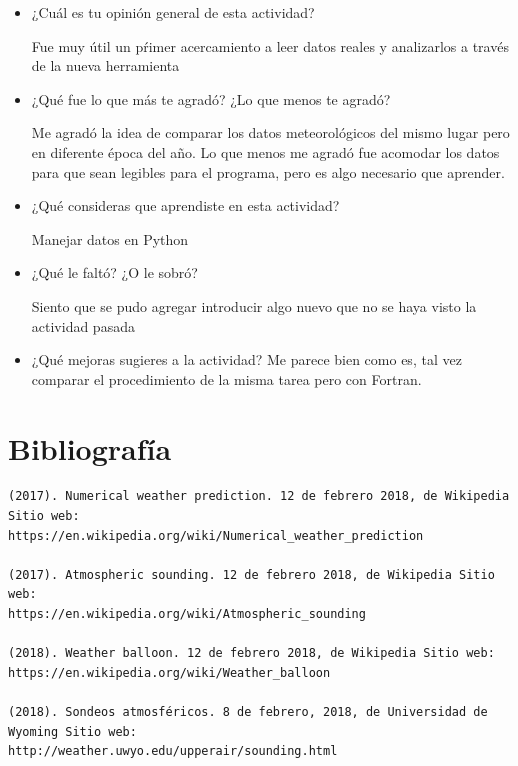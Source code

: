 \documentclass[a4paper]{article}
\begin{document}
\begin{itemize}
\item     ¿Cuál es tu opinión general de esta actividad?

Fue muy útil un pŕimer acercamiento a leer datos reales y analizarlos a través de la nueva herramienta

\item     ¿Qué fue lo que más te agradó? ¿Lo que menos te agradó?

Me agradó la idea de comparar los datos meteorológicos del mismo lugar pero en diferente época del año. Lo que menos me agradó fue acomodar los datos para que sean legibles para el programa, pero es algo necesario que aprender.  

\item     ¿Qué consideras que aprendiste en esta actividad? 

Manejar datos en Python

\item     ¿Qué le faltó? ¿O le sobró?

Siento que se pudo agregar introducir algo nuevo que no se haya visto la actividad pasada

\item     ¿Qué mejoras sugieres a la actividad?
Me parece bien como es, tal vez comparar el procedimiento de la misma tarea pero con Fortran.

\end{itemize}

\section*{Bibliografía}

\begin{verbatim}
(2017). Numerical weather prediction. 12 de febrero 2018, de Wikipedia Sitio web: 
https://en.wikipedia.org/wiki/Numerical_weather_prediction

(2017). Atmospheric sounding. 12 de febrero 2018, de Wikipedia Sitio web:
https://en.wikipedia.org/wiki/Atmospheric_sounding

(2018). Weather balloon. 12 de febrero 2018, de Wikipedia Sitio web: 
https://en.wikipedia.org/wiki/Weather_balloon

(2018). Sondeos atmosféricos. 8 de febrero, 2018, de Universidad de Wyoming Sitio web:
http://weather.uwyo.edu/upperair/sounding.html
\end{verbatim}
\end{document}
